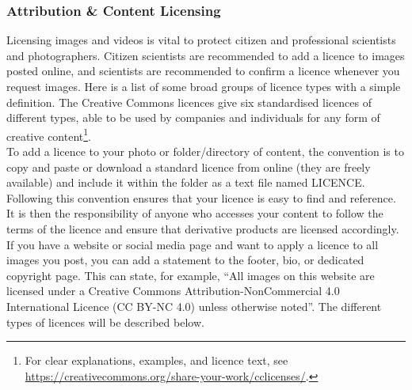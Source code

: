 \documentclass{article}
\newcommand{\contributed}[1]{%
    \par\noindent
    \begingroup
    \setlength{\leftskip}{1em}%
    \itshape
    Contributors: #1
    \par
    \endgroup
    \vspace{0.5em}
}
\begin{document}
\subsubsection{Attribution \& Content Licensing}\label{attribution-content-licensing}
Licensing images and videos is vital to protect citizen and professional scientists and photographers. Citizen scientists are recommended to add a licence to images posted online, and scientists are recommended to confirm a licence whenever you request images. Here is a list of some broad groups of licence types with a simple definition. The Creative Commons licences give six standardised licences of different types, able to be used by companies and individuals for any form of creative content\footnote{For clear explanations, examples, and licence text, see \url{https://creativecommons.org/share-your-work/cclicenses/}.}. \\

To add a licence to your photo or folder/directory of content, the convention is to copy and paste or download a standard licence from online (they are freely available) and include it within the folder as a text file named LICENCE. Following this convention ensures that your licence is easy to find and reference. It is then the responsibility of anyone who accesses your content to follow the terms of the licence and ensure that derivative products are licensed accordingly. If you have a website or social media page and want to apply a licence to all images you post, you can add a statement to the footer, bio, or dedicated copyright page. This can state, for example, ``All images on this website are licensed under a Creative Commons Attribution-NonCommercial 4.0 International Licence (CC BY-NC 4.0) unless otherwise noted''. The different types of licences will be described below.
\end{document}
